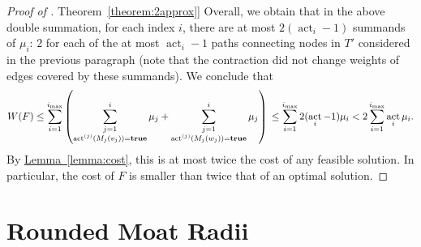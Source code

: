 \documentclass[letterpaper,11pt]{article}
\newcommand{\namedref}[2]{\hyperref[#2]{#1~\ref*{#2}}}
\newcommand{\theoremref}[1]{\namedref{Theorem}{#1}}
\newcommand{\lemmaref}[1]{\namedref{Lemma}{#1}}
\DeclareMathOperator{\act}{act}
\newcommand{\true}{\mathbf{true}}
\begin{document}
\begin{proof}[Proof of \theoremref{theorem:2approx}]
Overall, we obtain that in the above double summation, for each index $i$, there
are at most $2(\act_i-1)$ summands of $\mu_i$: $2$ for each of the at
most $\act_i-1$ paths connecting nodes in $T'$ considered in the previous
paragraph (note that the contraction did not change weights of edges covered by
these summands). We conclude that
\begin{equation*}
W(F) \leq  \sum_{i=1}^{i_{\max}}\left(\sum_{\substack{j=1\\
\act^{(j)}(M_j(v_j))=\true}}^i \mu_j +\sum_{\substack{j=1\\
\act^{(j)}(M_j(w_j))=\true}}^i \mu_j\right)\\
\leq \sum_{i=1}^{i_{\max}}2(\act_i-1)\mu_i\\
< 2\sum_{i=1}^{i_{\max}}\act_i\mu_i.
\end{equation*}
By \lemmaref{lemma:cost}, this is at most twice the cost of any feasible
solution. In particular, the cost of $F$ is smaller than twice that of an
optimal solution.
\end{proof}

\section{Rounded Moat Radii}
\label{app-epsilon}
\end{document}
